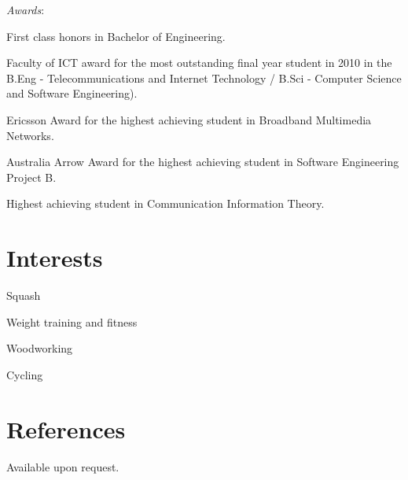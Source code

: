 \documentclass[line,margin]{res}
\begin{document}
\begin{resume}
        \textit{Awards}:
        \begin{list}{}{\leftmargin=1em \itemsep=-2pt}
            \item{First class honors in Bachelor of Engineering.}
            \item{Faculty of ICT award for the most outstanding final year student in 2010 in the B.Eng -
                Telecommunications and Internet Technology / B.Sci - Computer Science and Software
                Engineering).}
            \item{Ericsson Award for the highest achieving student in Broadband Multimedia Networks.}
            \item{Australia Arrow Award for the highest achieving student in Software Engineering Project B.}
            \item{Highest achieving student in Communication Information Theory.}
        \end{list}

        \section{Interests}
        \begin{list}{}{\leftmargin=1em \itemsep=-2pt}
            \item{Squash}
            \item{Weight training and fitness}
            \item{Woodworking}
            \item{Cycling}
        \end{list}

        \section{References}
        Available upon request.
    \end{resume}
\end{document}
